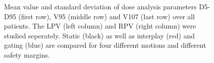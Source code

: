 \documentclass[type=dr, dr=rernat, accentcolor=tud7b,colorbacktitle, bigchapter, openright, twoside, 12pt ]{tudthesis}
\begin{document}
\begin{figure}[H]
{ }
\caption{Mean value and standard deviation of dose analysis parameters D5-D95 (first row), V95 (middle row) 
and V107 (last row) over all patients. The LPV (left column) and RPV (right column) were studied seperately. Static (black) as well as interplay (red) and gating (blue) 
are compared for four different motions and different safety margins.}
\label{static_interplay_gating}
\end{figure}
\end{document}

